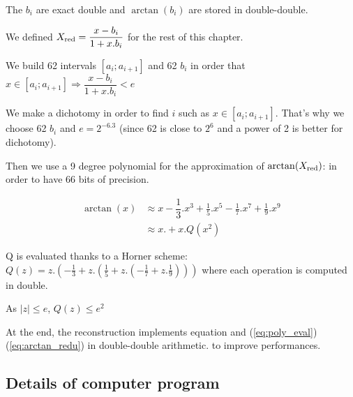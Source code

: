 The $b_i$ are exact double and $\arctan(b_i)$ are stored in
double-double.

We defined $X_{\mathrm{red}} = \dfrac{x-b_i}{1+x.b_i}$ for the rest of this chapter.

We build 62 intervals $[a_i;a_{i+1}]$ and 62 $b_i$ in order that $ x \in
[a_i;a_{i+1}] \Rightarrow \dfrac{x-b_i}{1+x.b_i} < e$

We make a dichotomy in order to find $i$ such as $ x \in [a_i;a_{i+1}]
$. That's why we choose 62 $b_i$ and $e=2^{-6.3}$ (since 62 is close to
$2^6$ and a power of 2 is better for dichotomy).

Then we use a 9 degree polynomial for the approximation of $\arctan(X_{\mathrm{red}})$:
in order to have 66 bits of precision.

\begin{equation}
\begin{split} \arctan(x)& \approx x - \dfrac{1}{3} .x^3 + \frac{1}{5}.x^5
- \frac{1}{7}.x^7 + \frac{1}{9}.x^9 \nonumber \\ \label{eq:poly_eval}
  & \approx x . + x.Q(x^2)
\end{split}
\end{equation}
 
Q is evaluated thanks to a Horner scheme:
$ Q(z) = z. (-\frac{1}{3} + z.(\frac{1}{5} + z.(-\frac{1}{7} +
z.\frac{1}{9}))) $
where each operation is computed in double.

As $|z| \leq e$, $Q(z) \leq e^2$

At the end, the reconstruction implements equation and (\ref{eq:poly_eval})  
(\ref{eq:arctan_redu}) in double-double
arithmetic.
 to improve performances.



\subsection{Details of computer program}

